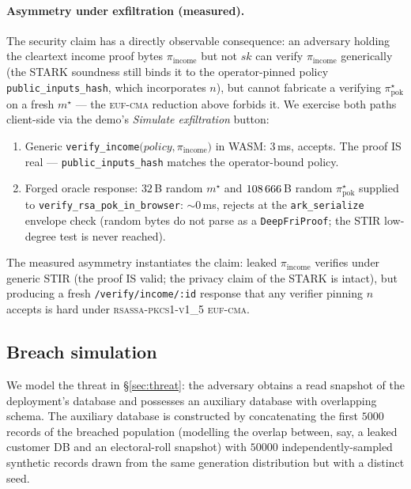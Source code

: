 \documentclass[11pt,a4paper]{article}
\begin{document}
\paragraph{Asymmetry under exfiltration (measured).}  The
security claim has a directly observable consequence: an
adversary holding the cleartext income proof bytes
$\pi_{\mathrm{income}}$ but not $\mathit{sk}$ can verify
$\pi_{\mathrm{income}}$ generically (the STARK soundness still
binds it to the operator\nobreakdash-pinned policy
\texttt{public\_inputs\_hash}, which incorporates $n$), but
cannot fabricate a verifying $\pi_{\mathrm{pok}}^{\star}$ on a
fresh $m^{\star}$ — the \textsc{euf\nobreakdash-cma}
reduction above forbids it.  We exercise both paths
client\nobreakdash-side via the demo's
\emph{Simulate exfiltration} button:

\begin{enumerate}
  \item Generic
        \texttt{verify\_income}$\bigl(\mathit{policy},
        \pi_{\mathrm{income}}\bigr)$ in WASM:
        $\num{3}$\,ms, accepts.  The proof IS real —
        \texttt{public\_inputs\_hash} matches the
        operator\nobreakdash-bound policy.
  \item Forged oracle response:
        $32$\,B random $m^{\star}$ and
        $\num{108\,666}$\,B random
        $\pi_{\mathrm{pok}}^{\star}$ supplied to
        \texttt{verify\_rsa\_pok\_in\_browser}:
        $\sim\!\num{0}$\,ms, rejects at the
        \texttt{ark\_serialize} envelope check (random bytes do
        not parse as a \texttt{DeepFriProof}; the STIR
        low\nobreakdash-degree test is never reached).
\end{enumerate}

The measured asymmetry instantiates the claim: leaked
$\pi_{\mathrm{income}}$ verifies under generic STIR (the proof
IS valid; the privacy claim of the STARK is intact), but
producing a fresh \texttt{/verify/income/:id} response that any
verifier pinning $n$ accepts is hard under
\textsc{rsassa\nobreakdash-pkcs1\nobreakdash-v1\_5}
\textsc{euf\nobreakdash-cma}.

\subsection{Breach simulation}
\label{sec:eval-breach}

We model the threat in \S\ref{sec:threat}: the adversary obtains a
read snapshot of the deployment's database and possesses an
auxiliary database with overlapping schema.  The auxiliary database
is constructed by concatenating the first $\num{5000}$ records of
the breached population (modelling the overlap between, say, a
leaked customer DB and an electoral\nobreakdash-roll snapshot) with
$\num{50000}$ independently\nobreakdash-sampled synthetic records
drawn from the same generation distribution but with a distinct
seed.
\end{document}
